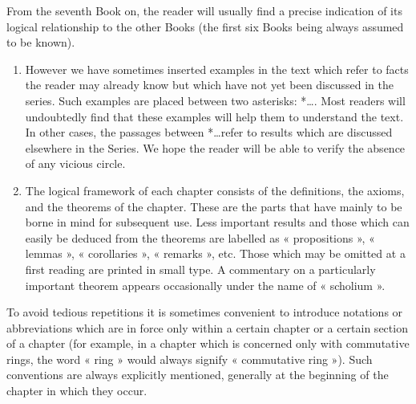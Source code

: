 From the seventh Book on, the reader will usually find a precise indication of its logical relationship to the other Books (the first six Books being always assumed to be known).

\begin{enumerate}
\def\labelenumi{\arabic{enumi}.}
\setcounter{enumi}{3}
\item
  However we have sometimes inserted examples in the text which refer to facts the reader may already know but which have not yet been discussed in the series. Such examples are placed between two asterisks: *\ldots*. Most readers will undoubtedly find that these examples will help them to understand the text. In other cases, the passages between *\ldots* refer to results which are discussed elsewhere in the Series. We hope the reader will be able to verify the absence of any vicious circle.
\item
  The logical framework of each chapter consists of the definitions, the axioms, and the theorems of the chapter. These are the parts that have mainly to be borne in mind for subsequent use. Less important results and those which can easily be deduced from the theorems are labelled as « propositions », « lemmas », « corollaries », « remarks », etc. Those which may be omitted at a first reading are printed in small type. A commentary on a particularly important theorem appears occasionally under the name of « scholium ».
\end{enumerate}

To avoid tedious repetitions it is sometimes convenient to introduce notations or abbreviations which are in force only within a certain chapter or a certain section of a chapter (for example, in a chapter which is concerned only with commutative rings, the word « ring » would always signify « commutative ring »). Such conventions are always explicitly mentioned, generally at the beginning of the chapter in which they occur.

